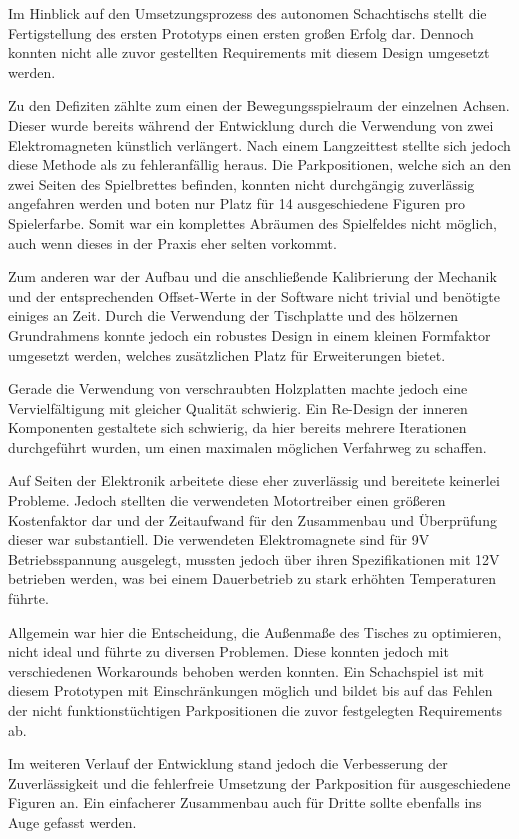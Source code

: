 Im Hinblick auf den Umsetzungsprozess des autonomen Schachtischs stellt
die Fertigstellung des ersten Prototyps einen ersten großen Erfolg dar.
Dennoch konnten nicht alle zuvor gestellten Requirements mit diesem
Design umgesetzt werden.

Zu den Defiziten zählte zum einen der Bewegungsspielraum der einzelnen
Achsen. Dieser wurde bereits während der Entwicklung durch die
Verwendung von zwei Elektromagneten künstlich verlängert. Nach einem
Langzeittest stellte sich jedoch diese Methode als zu fehleranfällig
heraus. Die Parkpositionen, welche sich an den zwei Seiten des
Spielbrettes befinden, konnten nicht durchgängig zuverlässig angefahren
werden und boten nur Platz für 14 ausgeschiedene Figuren pro
Spielerfarbe. Somit war ein komplettes Abräumen des Spielfeldes nicht
möglich, auch wenn dieses in der Praxis eher selten vorkommt.

Zum anderen war der Aufbau und die anschließende Kalibrierung der
Mechanik und der entsprechenden Offset-Werte in der Software nicht
trivial und benötigte einiges an Zeit. Durch die Verwendung der
Tischplatte und des hölzernen Grundrahmens konnte jedoch ein robustes
Design in einem kleinen Formfaktor umgesetzt werden, welches
zusätzlichen Platz für Erweiterungen bietet.

Gerade die Verwendung von verschraubten Holzplatten machte jedoch eine
Vervielfältigung mit gleicher Qualität schwierig. Ein Re-Design der
inneren Komponenten gestaltete sich schwierig, da hier bereits mehrere
Iterationen durchgeführt wurden, um einen maximalen möglichen Verfahrweg
zu schaffen.

Auf Seiten der Elektronik arbeitete diese eher zuverlässig und bereitete
keinerlei Probleme. Jedoch stellten die verwendeten Motortreiber einen
größeren Kostenfaktor dar und der Zeitaufwand für den Zusammenbau und
Überprüfung dieser war substantiell. Die verwendeten Elektromagnete sind
für 9V Betriebsspannung ausgelegt, mussten jedoch über ihren
Spezifikationen mit 12V betrieben werden, was bei einem Dauerbetrieb zu
stark erhöhten Temperaturen führte.

Allgemein war hier die Entscheidung, die Außenmaße des Tisches zu
optimieren, nicht ideal und führte zu diversen Problemen. Diese konnten
jedoch mit verschiedenen Workarounds behoben werden konnten. Ein
Schachspiel ist mit diesem Prototypen mit Einschränkungen möglich und
bildet bis auf das Fehlen der nicht funktionstüchtigen Parkpositionen
die zuvor festgelegten Requirements ab.

Im weiteren Verlauf der Entwicklung stand jedoch die Verbesserung der
Zuverlässigkeit und die fehlerfreie Umsetzung der Parkposition für
ausgeschiedene Figuren an. Ein einfacherer Zusammenbau auch für Dritte
sollte ebenfalls ins Auge gefasst werden.

